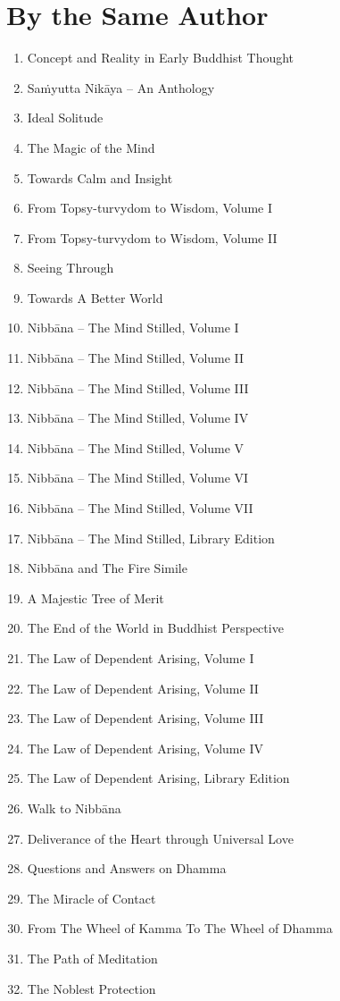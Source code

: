 \chapter{By the Same Author}

\bigskip

\begin{enumerate}[parsep=0pt]
\def\labelenumi{\arabic{enumi}.}
\item
  Concept and Reality in Early Buddhist Thought
\item
  Saṁyutta Nikāya -- An Anthology
\item
  Ideal Solitude
\item
  The Magic of the Mind
\item
  Towards Calm and Insight
\item
  From Topsy-turvydom to Wisdom, Volume I
\item
  From Topsy-turvydom to Wisdom, Volume II
\item
  Seeing Through
\item
  Towards A Better World
\item
  Nibbāna -- The Mind Stilled, Volume I
\item
  Nibbāna -- The Mind Stilled, Volume II
\item
  Nibbāna -- The Mind Stilled, Volume III
\item
  Nibbāna -- The Mind Stilled, Volume IV
\item
  Nibbāna -- The Mind Stilled, Volume V
\item
  Nibbāna -- The Mind Stilled, Volume VI
\item
  Nibbāna -- The Mind Stilled, Volume VII
\item
  Nibbāna -- The Mind Stilled, Library Edition
\item
  Nibbāna and The Fire Simile
\item
  A Majestic Tree of Merit
\item
  The End of the World in Buddhist Perspective
\item
  The Law of Dependent Arising, Volume I
\item
  The Law of Dependent Arising, Volume II
\item
  The Law of Dependent Arising, Volume III
\item
  The Law of Dependent Arising, Volume IV
\item
  The Law of Dependent Arising, Library Edition
\item
  Walk to Nibbāna
\item
  Deliverance of the Heart through Universal Love
\item
  Questions and Answers on Dhamma
\item
  The Miracle of Contact
\item
  From The Wheel of Kamma To The Wheel of Dhamma
\item
  The Path of Meditation
\item
  The Noblest Protection
\end{enumerate}

